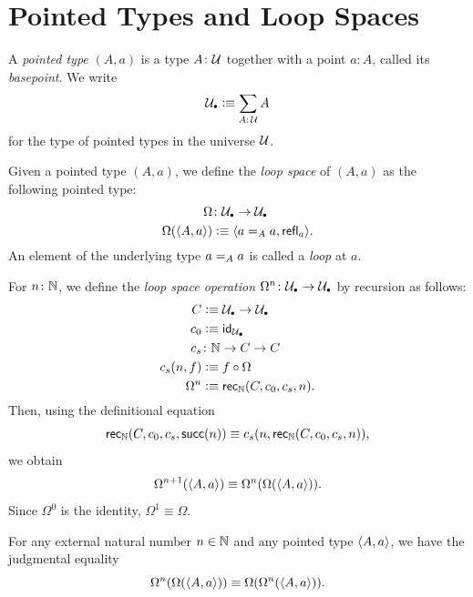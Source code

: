 \section{Pointed Types and Loop Spaces}

\begin{defn}\label{defn:pointed-type}
    A \textsl{pointed type}\/ $(A,a)$ is a type\/ $A\colon\univ$ together with a point\/ $a\colon A$, called its \textsl{basepoint}. We write
    \[
        \puniv\defeq\sum_{A:\,\univ}A
    \]
    for the type of pointed types in the universe\/ $\mathcal U$.
\end{defn}

\begin{defn}\label{defn:n-loop-space}
    Given a pointed type $(A,a)$, we define the \textsl{loop space} of $(A,a)$ as the following pointed type:
    \begin{align*}
        \Omega&\colon\puniv\to\puniv\\
        \Omega(\dep{A,a})&\defeq\dep{a\eq Aa,\fun{refl}_a}.        
    \end{align*}
    An element of the underlying type $a\mathrel{=_{A}}a$ is called a \textsl{loop} at $a$.
    
    For $n\colon\N$, we define the \textsl{loop space operation} $\Omega^n\colon\puniv\to\puniv$ by recursion as follows: 
    \begin{align*}
        C&\defeq\puniv\to\puniv\\
        c_0&\defeq\id_\puniv\\
        c_s&\colon\N\to C\to C\\
        c_s(n,f)&\defeq f\circ\Omega\\
        \Omega^n&\defeq\fun{rec}_\N(C,c_0,c_s,n).
    \end{align*}
    Then, using the definitional equation
    \[
        \mathsf{rec}_{\mathbb{N}}(C,c_0,c_s,\mathsf{succ}(n))
        \equiv c_s(n,\mathsf{rec}_{\mathbb{N}}(C,c_0,c_s,n)),
    \]
    we obtain
    \[
        \Omega^{n+1}(\langle A,a\rangle)
            \equiv\Omega^n(\Omega(\langle A,a\rangle)).
    \]
    Since $\Omega^0$ is the identity, $\Omega^1\equiv\Omega$.
\end{defn}

\begin{lem}\label{lem:omega^(n+1)-identity}
    For any external natural number\/ $n\in\mathbb{N}$ and any pointed type\/ $\langle A,a\rangle$, we have the judgmental equality
    \begin{equation}\label{eq:omega^(n+1)-identity}
        \Omega^n(\Omega(\langle A,a\rangle))
            \equiv\Omega(\Omega^n(\langle A,a\rangle)).
    \end{equation}
\end{lem}

